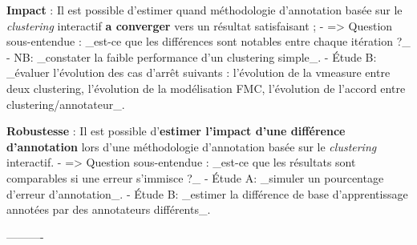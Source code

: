 \item \textbf{Impact} : Il est possible d'estimer quand méthodologie d'annotation basée sur le \textit{clustering} interactif \textbf{a converger} vers un résultat satisfaisant ;
    - => Question sous-entendue : _est-ce que les différences sont notables entre chaque itération ?_
	- NB: _constater la faible performance d'un clustering simple_.
	- Étude B: _évaluer l'évolution des cas d'arrêt suivants : l'évolution de la vmeasure entre deux clustering, l'évolution de la modélisation FMC, l'évolution de l'accord entre clustering/annotateur_.
	
\item \textbf{Robustesse} : Il est possible d'\textbf{estimer l'impact d'une différence d'annotation} lors d'une méthodologie d'annotation basée sur le \textit{clustering} interactif.
	- => Question sous-entendue : _est-ce que les résultats sont comparables si une erreur s’immisce ?_
	- Étude A: _simuler un pourcentage d'erreur d'annotation_.
	- Étude B: _estimer la différence de base d'apprentissage annotées par des annotateurs différents_.
	
	
----------

	
